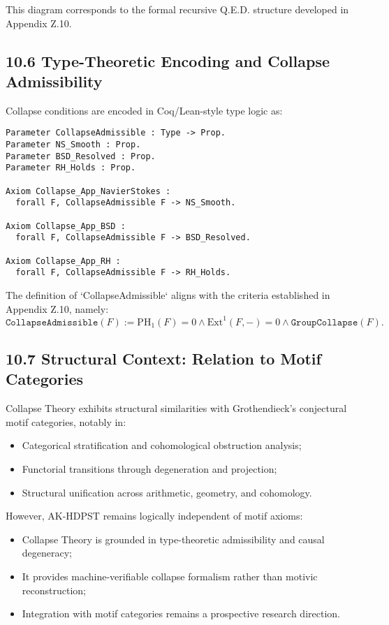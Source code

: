 \documentclass[11pt]{article}
\begin{document}
This diagram corresponds to the formal recursive Q.E.D. structure developed in Appendix Z.10.

\subsection*{10.6 Type-Theoretic Encoding and Collapse Admissibility}

Collapse conditions are encoded in Coq/Lean-style type logic as:

\begin{lstlisting}[language=Coq]
Parameter CollapseAdmissible : Type -> Prop.
Parameter NS_Smooth : Prop.
Parameter BSD_Resolved : Prop.
Parameter RH_Holds : Prop.

Axiom Collapse_App_NavierStokes :
  forall F, CollapseAdmissible F -> NS_Smooth.

Axiom Collapse_App_BSD :
  forall F, CollapseAdmissible F -> BSD_Resolved.

Axiom Collapse_App_RH :
  forall F, CollapseAdmissible F -> RH_Holds.
\end{lstlisting}

The definition of `CollapseAdmissible` aligns with the criteria established in Appendix Z.10, namely:
\[
\texttt{CollapseAdmissible}(F) := \mathrm{PH}_1(F) = 0 \wedge \mathrm{Ext}^1(F, -) = 0 \wedge \texttt{GroupCollapse}(F).
\]

\subsection*{10.7 Structural Context: Relation to Motif Categories}

Collapse Theory exhibits structural similarities with Grothendieck's conjectural motif categories, notably in:

\begin{itemize}
    \item Categorical stratification and cohomological obstruction analysis;
    \item Functorial transitions through degeneration and projection;
    \item Structural unification across arithmetic, geometry, and cohomology.
\end{itemize}

However, AK-HDPST remains logically independent of motif axioms:

\begin{itemize}
    \item Collapse Theory is grounded in type-theoretic admissibility and causal degeneracy;
    \item It provides machine-verifiable collapse formalism rather than motivic reconstruction;
    \item Integration with motif categories remains a prospective research direction.
\end{itemize}
\end{document}
